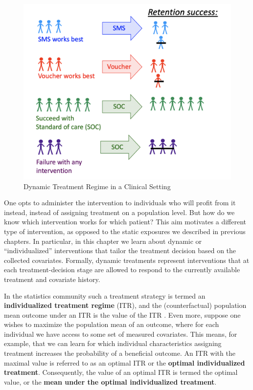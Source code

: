 \documentclass[12pt, krantz2,]{book}
\theoremstyle{definition}
\theoremstyle{definition}
\theoremstyle{definition}
\newcommand{\1}{\mathbbm{1}}
\begin{document}
\begin{figure}

{\centering \includegraphics[width=0.8\linewidth]{img/image/DynamicA_Illustration} 

}

\caption{Dynamic Treatment Regime in a Clinical Setting}\label{fig:unnamed-chunk-1}
\end{figure}

One opts to administer the intervention to individuals who will profit from it instead,
instead of assigning treatment on a population level. But how do we know which
intervention works for which patient? This aim motivates a different type of
intervention, as opposed to the static exposures we described in previous chapters. In
particular, in this chapter we learn about dynamic or ``individualized''
interventions that tailor the treatment decision based on the collected
covariates. Formally, dynamic treatments represent interventions that at each
treatment-decision stage are allowed to respond to the currently available
treatment and covariate history.

In the statistics community such a treatment strategy is termed an
\textbf{individualized treatment regime} (ITR), and the (counterfactual) population
mean outcome under an ITR is the value of the ITR \citep{neyman1990, robins1986, pearl2009}. Even more, suppose one wishes to maximize the population mean of an
outcome, where for each individual we have access to some set of measured
covariates. This means, for example, that we can learn for which individual
characteristics assigning treatment increases the probability of a beneficial
outcome. An ITR with the maximal value is referred to as an
optimal ITR or the \textbf{optimal individualized treatment}. Consequently, the value
of an optimal ITR is termed the optimal value, or the \textbf{mean under the optimal
individualized treatment}.
\end{document}
